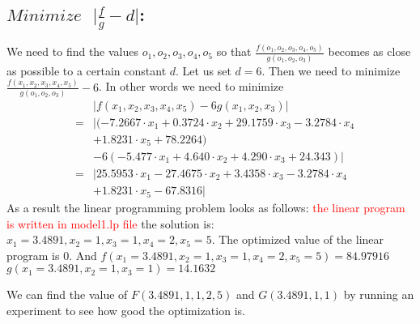 \documentclass[12pt]{article}
\begin{document}
\subsection{$Minimize \text{ } \vert\frac{f}{g}-d\vert$:} We need to find the values $o_1,o_2,o_3,o_4,o_5$ so that $\frac{f(o_1,o_2,o_3,o_4,o_5)}{g(o_1,o_2,o_3)}$ becomes as close as possible to a certain constant $d$. Let us set $d=6$. Then we need to minimize $\frac{f(x_1,x_2,x_3,x_4,x_5)}{g(o_1,o_2,o_3)}-6$. In other words we need to minimize 
\begin{eqnarray*}
& & \vert f(x_1,x_2,x_3,x_4,x_5) - 6 g(x_1,x_2,x_3) \vert\\
&=& \vert(-7.2667 \cdot x_1 + 0.3724 \cdot x_2 + 29.1759 \cdot x_3 - 3.2784 \cdot x_4\\
& & + 1.8231 \cdot x_5 + 78.2264)\\
& & - 6(-5.477 \cdot x_1 + 4.640 \cdot x_2 + 4.290 \cdot x_3 + 24.343)\vert \\
&=& \vert 25.5953 \cdot x_1 - 27.4675 \cdot x_2 + 3.4358 \cdot x_3 - 3.2784 \cdot x_4\\
& & + 1.8231 \cdot x_5 - 67.8316 \vert
\end{eqnarray*}
 As a result the linear programming problem looks as follows:
\textcolor{red}{the linear program is written in model1.lp file} 
the solution is:
$x_1 = 3.4891, x_2 = 1, x_3 = 1, x_4 = 2, x_5 = 5 $. The optimized value of the linear program is $0$. And
$f(x_1 = 3.4891, x_2 = 1, x_3 = 1, x_4 = 2, x_5 = 5) = 84.97916$\\
$g(x_1 = 3.4891, x_2 = 1, x_3 = 1) = 14.1632$

We can find the value of $F(3.4891,1,1,2,5)$ and $G(3.4891,1,1)$ by running an experiment to see how good the optimization is.
\end{document}
